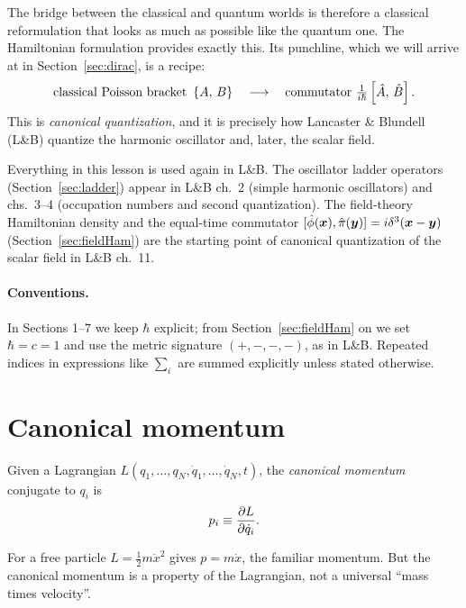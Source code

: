 \documentclass[11pt]{article}
\begin{document}
The bridge between the classical and quantum worlds is therefore a classical reformulation that looks as much as possible like the quantum one. The Hamiltonian formulation provides exactly this. Its punchline, which we will arrive at in Section~\ref{sec:dirac}, is a recipe:
\[
 \text{classical Poisson bracket}\ \pb{A}{B}\quad\longrightarrow\quad \text{commutator}\ \tfrac{1}{i\hbar}\comm{\hat A}{\hat B}.
\]
This is \emph{canonical quantization}, and it is precisely how Lancaster \& Blundell (L\&B) quantize the harmonic oscillator and, later, the scalar field.

\begin{qftbridge}
Everything in this lesson is used again in L\&B. The oscillator ladder operators (Section~\ref{sec:ladder}) appear in L\&B ch.~2 (simple harmonic oscillators) and chs.~3--4 (occupation numbers and second quantization). The field-theory Hamiltonian density and the equal-time commutator $[\hat\phi(\bm{x}),\hat\pi(\bm{y})]=i\delta^3(\bm{x}-\bm{y})$ (Section~\ref{sec:fieldHam}) are the starting point of canonical quantization of the scalar field in L\&B ch.~11.
\end{qftbridge}

\paragraph{Conventions.} In Sections 1--7 we keep $\hbar$ explicit; from Section~\ref{sec:fieldHam} on we set $\hbar=c=1$ and use the metric signature $(+,-,-,-)$, as in L\&B. Repeated indices in expressions like $\sum_i$ are summed explicitly unless stated otherwise.

\section{Canonical momentum}

\begin{definition}
Given a Lagrangian $L(q_1,\dots,q_N,\dot q_1,\dots,\dot q_N,t)$, the \emph{canonical momentum} conjugate to $q_i$ is
\begin{equation}
 p_i \equiv \frac{\partial L}{\partial \dot q_i}.
\end{equation}
\end{definition}

For a free particle $L=\tfrac12 m\dot x^2$ gives $p=m\dot x$, the familiar momentum. But the canonical momentum is a property of the Lagrangian, not a universal ``mass times velocity''.
\end{document}
